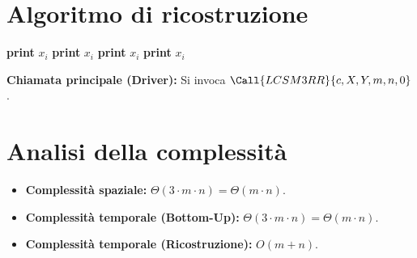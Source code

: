 \section{Algoritmo di ricostruzione}
\begin{algorithm}[htbp]
\caption{Ricostruzione della sequenza LCS con numero di rossi multiplo di 3}
\begin{algorithmic}[1]
        \State \Return
    \Else
                \State {}
            \Else
                \State {}
            \EndIf
        \Else
                \State {}
                \State \textbf{print} $x_i$
            \Else
                        \State {}
                        \State \textbf{print} $x_i$
                    \Else
                        \State {}
                    \EndIf
                    \State {}
                    \State \textbf{print} $x_i$
                \Else
                    \State {}
                    \State \textbf{print} $x_i$
                \EndIf
            \EndIf
        \EndIf
    \EndIf
\EndProcedure
\end{algorithmic}
\end{algorithm}

\noindent
\textbf{Chiamata principale (Driver):} Si invoca $\Call{LCSM3RR}{c, X, Y, m, n, 0}$.

\section{Analisi della complessità}
\begin{itemize}
    \item \textbf{Complessità spaziale:} $\Theta(3 \cdot m \cdot n) = \Theta(m \cdot n)$.
    \item \textbf{Complessità temporale (Bottom-Up):} $\Theta(3 \cdot m \cdot n) = \Theta(m \cdot n)$.
    \item \textbf{Complessità temporale (Ricostruzione):} $O(m + n)$.
\end{itemize}